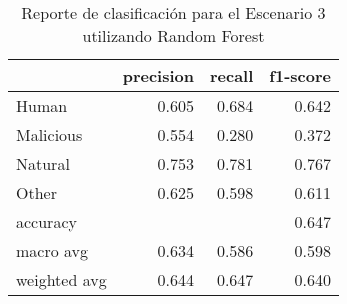 \begin{table}
\centering
\caption{Reporte de clasificación para el Escenario 3 utilizando Random Forest}
\label{tab:RF_Escenario 3}
\begin{tabular}{lrrr}
\toprule
{} &  precision &  recall &  f1-score \\
\midrule
Human        &      0.605 &   0.684 &     0.642 \\
Malicious    &      0.554 &   0.280 &     0.372 \\
Natural      &      0.753 &   0.781 &     0.767 \\
Other        &      0.625 &   0.598 &     0.611 \\
accuracy     &            &         &     0.647 \\
macro avg    &      0.634 &   0.586 &     0.598 \\
weighted avg &      0.644 &   0.647 &     0.640 \\
\bottomrule
\end{tabular}
\end{table}
